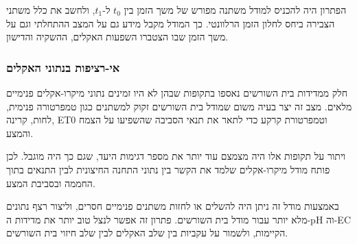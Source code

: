 הפתרון היה להכניס למודל משתנה מפורש של משך הזמן בין $t_0$ ל-$t_1$, ולחשב את כלל משתני הצבירה ביחס לחלון הזמן הרלוונטי. כך המודל מקבל מידע גם על המצב ההתחלתי וגם על משך הזמן שבו הצטברו השפעות האקלים, ההשקיה והדישון.

\subsubsection{אי-רציפות בנתוני האקלים}
חלק ממדידות בית השורשים נאספו בתקופות שבהן לא היו זמינים נתוני מיקרו-אקלים פנימיים מלאים. מצב זה יצר בעיה משום שמודל בית השורשים זקוק למשתנים כגון טמפרטורה פנימית, לחות, קרינה, ET0 וטמפרטורת קרקע כדי לתאר את תנאי הסביבה שהשפיעו על הצמח והמצע.

ויתור על תקופות אלו היה מצמצם עוד יותר את מספר דגימות היעד, שגם כך היה מוגבל. לכן פותח מודל מיקרו-אקלים שלמד את הקשר בין נתוני התחנה החיצונית לבין התנאים בתוך החממה ובסביבת המצע.

באמצעות מודל זה ניתן היה להשלים או לחזות משתנים פנימיים חסרים, וליצור רצף נתונים מלא יותר עבור מודל בית השורשים. פתרון זה אפשר לנצל טוב יותר את מדידות ה-pH וה-EC הקיימות, ולשמור על עקביות בין שלב האקלים לבין שלב חיזוי בית השורשים.

